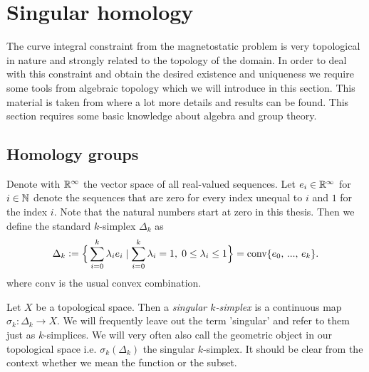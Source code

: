 \documentclass[../master_thesis.tex]{subfiles}
\begin{document}


\section{Singular homology}\label{sec:singular_homology}

The curve integral constraint from the magnetostatic problem is very topological %
in nature and strongly related to the topology of the domain. 
In order to deal with this constraint and obtain the desired existence and
uniqueness we require some tools from algebraic topology which we will introduce 
in this section. 
This material is taken from
\cite{topology_and_geometry} where a lot more details and results can be found.
This section requires some basic knowledge about algebra and group theory.


\subsection{Homology groups}

Denote with $\mathbb{R}^\infty$ the vector space of all real-valued sequences. Let 
$e_i \in \mathbb{R}^\infty$ for $i \in \mathbb{N}$ denote the sequences 
that are zero for every index 
unequal to $i$ and $1$ for the index $i$. Note that 
the natural numbers start at zero in this thesis. Then we define the standard $k$-simplex 
$\Delta_k$ as
\begin{align*}
    \Delta_k \vcentcolon= \Big\{ \sum\limits_{i=0}^k  \lambda_i e_i \mid 
    \sum\limits_{i=0}^k \lambda_i = 1 , \; 0\leq \lambda_i \leq 1\Big\}
    = \text{conv} \{e_0,\,...,\, e_k\}.
\end{align*}
where $\text{conv}$ is the usual convex combination. 

\begin{definition}[$k$-simplex]
    Let $X$ be a topological space. Then a \textit{singular $k$-simplex} is a continuous 
    map $\sigma_k: \Delta_k \rightarrow X$. We will frequently leave out the term 'singular'
    and refer to them just as $k$-simplices. We will very often also call 
    the geometric object in our topological space i.e. $\sigma_k(\Delta_k)$
    the singular $k$-simplex. It should be clear from the context whether we mean 
    the function or the subset.
\end{definition}
\end{document}
